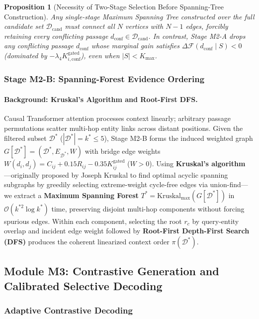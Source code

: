 \documentclass[11pt]{article}
\newtheorem{proposition}{Proposition}
\begin{document}
\begin{proposition}[Necessity of Two-Stage Selection Before Spanning-Tree Construction]
\label{prop:twostage_mst}
Any single-stage Maximum Spanning Tree constructed over the full candidate set $\mathcal{D}_{\text{cand}}$ must connect all $N$ vertices with $N-1$ edges, forcibly retaining every conflicting passage $d_{\text{conf}} \in \mathcal{D}_{\text{cand}}$. In contrast, Stage M2-A drops any conflicting passage $d_{\text{conf}}$ whose marginal gain satisfies $\Delta \mathcal{F}(d_{\text{conf}} \mid S) < 0$ (dominated by $-\lambda_4 K_{i,\text{conf}}^{\text{gated}}$), even when $|S| < K_{\max}$.
\end{proposition}

\subsubsection{Stage M2-B: Spanning-Forest Evidence Ordering}
\paragraph{Background: Kruskal's Algorithm and Root-First DFS.}
Causal Transformer attention processes context linearly; arbitrary passage permutations scatter multi-hop entity links across distant positions. Given the filtered subset $\mathcal{D}^*$ ($|\mathcal{D}^*| = k^* \le 5$), Stage M2-B forms the induced weighted graph $G[\mathcal{D}^*] = (\mathcal{D}^*, E_{\mathcal{D}^*}, W)$ with bridge edge weights $W(d_i, d_j) = C_{ij} + 0.15 R_{ij} - 0.35 K_{ij}^{\text{gated}}$ ($W > 0$). Using \textbf{Kruskal's algorithm} \cite{kruskal1956shortest}---originally proposed by Joseph Kruskal to find optimal acyclic spanning subgraphs by greedily selecting extreme-weight cycle-free edges via union-find---we extract a \textbf{Maximum Spanning Forest} $T^* = \text{Kruskal}_{\max}(G[\mathcal{D}^*])$ in $\mathcal{O}(k^{*2}\log k^*)$ time, preserving disjoint multi-hop components without forcing spurious edges. Within each component, selecting the root $r_c$ by query-entity overlap and incident edge weight followed by \textbf{Root-First Depth-First Search (DFS)} produces the coherent linearized context order $\pi(\mathcal{D}^*)$.

\subsection{Module M3: Contrastive Generation and Calibrated Selective Decoding}

\subsubsection{Adaptive Contrastive Decoding}
\end{document}
